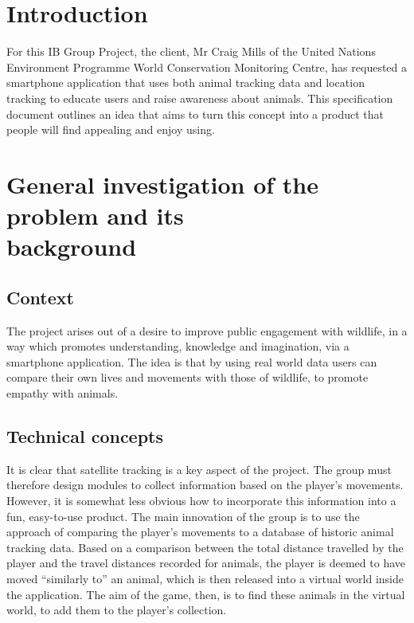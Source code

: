 \documentclass[12pt,a4paper,twoside]{article}
\begin{document}

\newpage
\pagestyle{empty}
\cleardoublepage                             %
\newpage


\section{Introduction}

For this IB Group Project, the client, Mr Craig Mills of the United Nations Environment Programme World Conservation Monitoring Centre, has requested a smartphone application that uses both animal tracking data and location tracking to educate users and raise awareness about animals. This specification document outlines an idea that aims to turn this concept into a product that people will find appealing and enjoy using.

\section{General investigation of the problem and its \\ background}
\subsection{Context}

The project arises out of a desire to improve public engagement with wildlife, in a way which promotes understanding, knowledge and imagination, via a smartphone application. 
The idea is that by using real world data users can compare their own lives and movements with those of wildlife, to promote empathy with animals.


\subsection{Technical concepts}
It is clear that satellite tracking is a key aspect of the project.
The group must therefore design modules to collect information based on the player's movements.
However, it is somewhat less obvious how to incorporate this information into a fun, easy-to-use product.
The main innovation of the group is to use the approach of comparing the player's movements to a database of historic animal tracking data.
Based on a comparison between the total distance travelled by the player and the travel distances recorded for animals, the player is deemed to have moved ``similarly to'' an animal, which is then released into a virtual world inside the application.
The aim of the game, then, is to find these animals in the virtual world, to add them to the player's collection.
\end{document}

